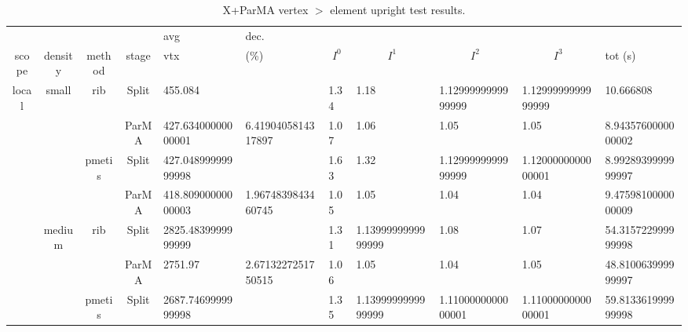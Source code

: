 \begin{table} [htpb] \centering
  \footnotesize
  \caption{X+ParMA vertex $>$ element upright test results.}
  \label{tbl:upResults}
  \begin{tabular}
    { c       c         c        c       F{4}{1}              F{1}{2}              F{1}{2}                       F{1}{2} F{1}{2} F{1}{2} F{3}{2} }
                   &         &        &       & {avg}              & {dec.}              &                             &                             &                             &                             & \\
            scope  & density & method & stage & {vtx}              & {(\%)}              &  &  &  &  & {tot (s)}\\
            \hline
            local  & small   & rib    & Split & 455.084            &                     & 1.34                        & 1.18                        & 1.1299999999999999          & 1.1299999999999999          & 10.666808\\
                   &         &        & ParMA & 427.63400000000001 & 6.4190405814317897  & 1.07                        & 1.06                        & 1.05                        & 1.05                        & 8.9435760000000002\\
            \hline
                   &         & pmetis & Split & 427.04899999999998 &                     & 1.63                        & 1.32                        & 1.1299999999999999          & 1.1200000000000001          & 8.9928939999999997\\
                   &         &        & ParMA & 418.80900000000003 & 1.9674839843460745  & 1.05                        & 1.05                        & 1.04                        & 1.04                        & 9.4759810000000009\\
            \hline
                   & medium  & rib    & Split & 2825.4839999999999 &                     & 1.31                        & 1.1399999999999999          & 1.08                        & 1.07                        & 54.315722999999998\\
                   &         &        & ParMA & 2751.97            & 2.6713227251750515  & 1.06                        & 1.05                        & 1.04                        & 1.05                        & 48.810063999999997\\
            \hline
                   &         & pmetis & Split & 2687.7469999999998 &                     & 1.35                        & 1.1399999999999999          & 1.1100000000000001          & 1.1100000000000001          & 59.813361999999998\\

\end{tabular}
\end{table}
